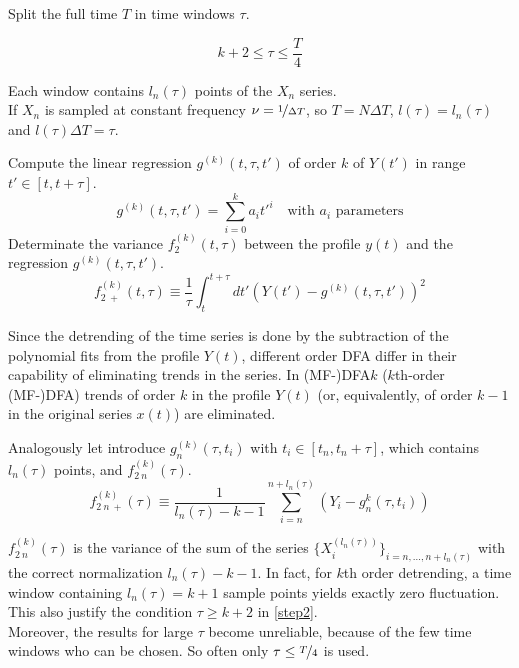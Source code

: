\begin{step}\label{step2}
Split the full time $T$ in time windows $\tau$.

\begin{equation}
	k+2 \le \tau \le \frac{T}{4}
\end{equation}

Each window contains $l_n(\tau)$ points of the $X_n$ series. \\
If $X_n$ is sampled at constant frequency $\nu = \nicefrac{1}{\Delta T}$, so $T = N \Delta T$, $l(\tau) = l_n(\tau)$ and $l(\tau) \Delta T = \tau $. 
\end{step}

\begin{step}\label{step3}
Compute the linear regression $ g^{( k )}(t, \tau, t') $ of order $k$ of $Y(t')$ in range $t' \in \left[t, t + \tau \right]$.
\begin{equation}
	g^{( k )}(t, \tau, t') = \sum_{i=0}^{k} a_i t'^{i} \quad \text{with $a_i$ parameters}
\end{equation}
Determinate the variance $ f_2^{( k )}( t, \tau ) $ between the profile $ y(t) $ and the regression $ g^{( k )}(t, \tau, t') $.
\begin{equation}
	f_{2 \ +}^{( k )}( t, \tau ) \equiv \frac{1}{\tau} \int_{t}^{t+\tau} dt' \left( Y( t' ) - g^{( k )}(t, \tau, t')  \right)^2
\end{equation}

Since the detrending of the time series is done by the subtraction of the polynomial fits from the profile $Y(t)$, different order DFA differ in their capability of eliminating trends in the series. In (MF-)DFA$k$ ($k$th-order (MF-)DFA) trends of order $k$ in the profile $Y(t)$ (or, equivalently, of order $k-1$ in the original series $x(t)$) are eliminated. 

Analogously let introduce $g_n^{(k)}(\tau, t_i)$ with $t_i \in [t_n, t_n + \tau]$, which contains $l_n(\tau)$ points, and $f_{2\ n}^{( k )}( \tau )$.
\begin{equation}
	f_{2\ n \ +}^{( k )}( \tau ) \equiv \frac{1}{l_n(\tau) - k - 1} \sum_{i=n}^{n + l_n(\tau)} \left(Y_i - g_n^{k} (\tau, t_i) \right)
\end{equation}

$f_{2\ n}^{( k )}( \tau )$ is the variance of the sum of the series $\{ X^{(l_n(\tau))}_i\}_{i= n, \dots, n+l_n(\tau)} $ with the correct normalization $l_n(\tau) - k - 1$. In fact, for $k$th order detrending, a time window containing $l_n(\tau) = k + 1$ sample points yields exactly zero fluctuation. This also justify the condition $\tau \ge k+2$ in \autoref{step2}.\\
Moreover, the results for large $\tau$ become unreliable, because of the few time windows who can be chosen. So often only $\tau \le \nicefrac{T}{4}$ is used. 


\end{step}
